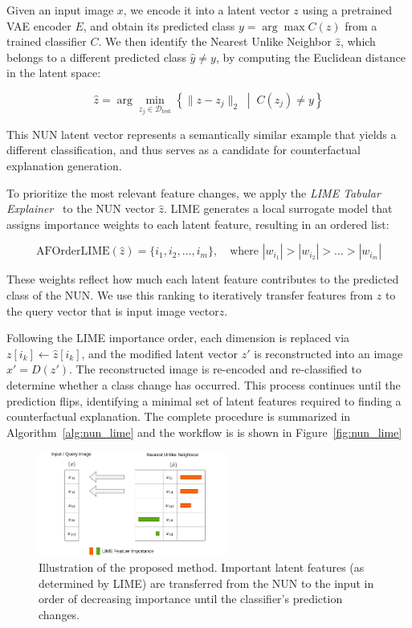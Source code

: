 Given an input image \( x \), we encode it into a latent vector \( z \) using a pretrained VAE encoder \( E \), and obtain its predicted class \( y = \arg\max C(z) \) from a trained classifier \( C \). We then identify the Nearest Unlike Neighbor \( \hat{z} \), which belongs to a different predicted class \( \hat{y} \ne y \), by computing the Euclidean distance in the latent space:

\[
\hat{z} = \arg\min_{z_j \in \mathcal{D}_{\text{test}}} \left\{ \| z - z_j \|_2 \; \middle| \; C(z_j) \ne y \right\}
\]

This NUN latent vector represents a semantically similar example that yields a different classification, and thus serves as a candidate for counterfactual explanation generation.

To prioritize the most relevant feature changes, we apply the \textit{LIME Tabular Explainer}~\cite{Ribeiro2018} to the NUN vector \( \hat{z} \). LIME generates a local surrogate model that assigns importance weights to each latent feature, resulting in an ordered list:

\[
\text{AFOrderLIME}(\hat{z}) = \{ i_1, i_2, \dots, i_m \}, \quad \text{where } |w_{i_1}| > |w_{i_2}| > \dots > |w_{i_m}|
\]

These weights reflect how much each latent feature contributes to the predicted class of the NUN. We use this ranking to iteratively transfer features from \( \hat{z} \) to the query vector that is input image vector\( z \).

Following the LIME importance order, each dimension is replaced via \( z[i_k] \leftarrow \hat{z}[i_k] \), and the modified latent vector \( z' \) is reconstructed into an image \( x' = D(z') \). The reconstructed image is re-encoded and re-classified to determine whether a class change has occurred. This process continues until the prediction flips, identifying a minimal set of latent features required to finding a counterfactual explanation. The complete procedure is summarized in Algorithm~\ref{alg:nun_lime} and the workflow is is shown in Figure~\ref{fig:nun_lime}

\begin{figure}[htbp]
    \centering
    \includegraphics[width=0.55\textwidth]{img/masking/lime_on_latent_nun/NUN_method.drawio.png}
    \caption{Illustration of the proposed method. Important latent features (as determined by LIME) are transferred from the NUN to the input in order of decreasing importance until the classifier's prediction changes.}
    \label{fig:nun_lime_workflow}
\end{figure}


